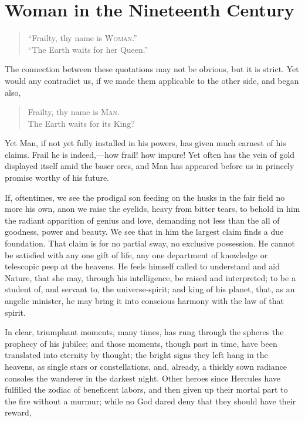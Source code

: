 
\author{Margaret Fuller}
\chapter[Woman in the Nineteenth Century, excerpt]{Woman in the
Nineteenth Century}

\begin{verse}
``Frailty, thy name is \textsc{Woman}.''\\
``The Earth waits for her Queen.''
\end{verse}

\noindent The connection between these quotations may not be obvious,
but it is strict. Yet would any contradict us, if we made them
applicable to the other side, and began also,

\begin{verse}
Frailty, thy name is \textsc{Man}.\\
The Earth waits for its King?
\end{verse}

\noindent Yet Man, if not yet fully installed in his powers, has given
much earnest of his claims. Frail he is indeed,---how frail! how
impure! Yet often has the vein of gold displayed itself amid the baser
ores, and Man has appeared before us in princely promise worthy of his
future.

If, oftentimes, we see the prodigal son feeding on the husks in the
fair field no more his own, anon we raise the eyelids, heavy from
bitter tears, to behold in him the radiant apparition of genius and
love, demanding not less than the all of goodness, power and beauty.
We see that in him the largest claim finds a due foundation. 
That claim is for no partial sway, no exclusive possession. He cannot
be satisfied with any one gift of life, any one department of
knowledge or telescopic peep at the heavens. He feels himself called
to understand and aid Nature, that she may, through his
intelligence, be raised and interpreted; to be a student of, and
servant to, the universe-spirit; and king of his planet, that, as an
angelic minister, he may bring it into conscious harmony with the law
of that spirit.

In clear, triumphant moments, many times, has rung through the spheres
the prophecy of his jubilee; and those moments, though past in time,
have been translated into eternity by thought; the bright signs they
left hang in the heavens, as single stars or constellations, and,
already, a thickly sown radiance consoles the wanderer in the darkest
night. Other heroes since Hercules have fulfilled the zodiac of
beneficent labors, and then given up their mortal part to the fire
without a murmur; while no God dared deny that they should have their
reward,

